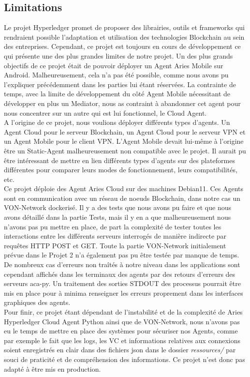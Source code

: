 \documentclass[12pt, openany]{report}
\begin{document}
\subsection{Limitations}
\noindent 
\begin{flushleft}
Le projet Hyperledger promet de proposer des librairies, outils et frameworks qui rendraient possible l'adaptation et utilisation des technologies Blockchain au sein des entreprises. Cependant, ce projet est toujours en cours de développement ce qui présente une des plus grandes limites de notre projet. Un des plus grands objectifs de ce projet était de pouvoir déployer un Agent Aries Mobile sur Android. Malheureusement, cela n'a pas été possible, comme nous avons pu l'expliquer précédemment dans les parties lui étant réservées. La contrainte de temps, avec la limite de développement du côté Agent Mobile nécessitant de développer en plus un Mediator, nous as contraint à abandonner cet agent pour nous concentrer sur un autre qui est lui fonctionnel, le Cloud Agent.\\
A l'origine de ce projet, nous voulions déployer différents types d'agents. Un Agent Cloud pour le serveur Blockchain, un Agent Cloud pour le serveur VPN et un Agent Mobile pour le client VPN. L'Agent Mobile devait lui-même à l'origine être un Static-Agent malheureusement non compatible avec le projet. Il aurait pu être intéressant de mettre en lien différents types d'agents sur des plateformes différentes pour comparer leurs modes de fonctionnement, leurs compatibilités, etc.\\
Ce projet déploie des Agent Aries Cloud sur des machines Debian11. Ces Agents sont en communication avec un réseau de noeuds Blockchain, dans notre cas un VON-Network dockerisé. Il y a des tests que nous avons pu faire et que nous avons détaillé dans la partie Tests, mais il y en a que malheureusement nous n'avons pas pu mettre en place, de part la complexité de tester toutes les interactions entre les différents serveurs interrogés de manière indirecte par requêtes HTTP POST et GET. Toute la partie VON-Network initialement prévue dans le Projet 2 n'a également pas pu être testée par manque de temps. De nombreux cas d'erreurs non traîtés à notre niveau dans les applications sont cependant affichés dans les terminaux des agents par des retours d'erreurs des serveurs aca-py. Un traitement des sorties STDOUT des processus pourrait être mis en place pour à minima renseigner les erreurs proprement dans les interfaces graphiques des agents.\\
Pour finir, ce projet étant dépendant de l'instabilité et de la complexité de Aries Hyperledger Cloud Agent Python ainsi que de VON-Network, nous n'avons pas eu le temps de mettre en place des systèmes pour sécuriser nos Agents, comme par exemple le fait que les logs, les VC et informations relatives aux connexions soient enregistrés en clair dans des fichiers json dans le dossier \textit{ressources/} par souci de praticité et de compréhension des informations. Ce projet n'est donc pas adapté à être mis en production.
\end{flushleft}
\end{document}
